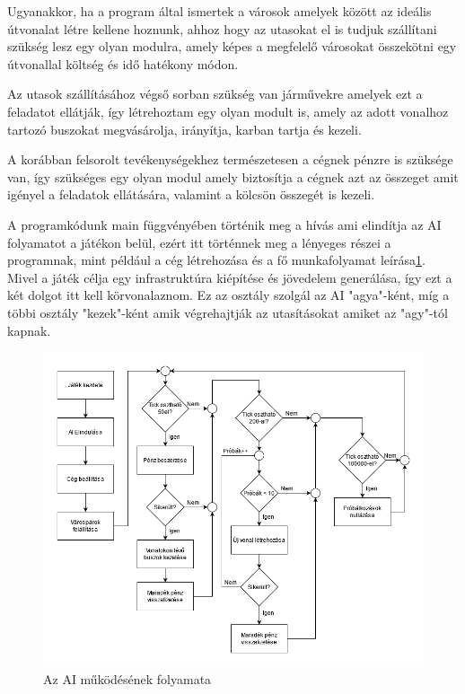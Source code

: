 Ugyanakkor, ha a program által ismertek a városok amelyek között az ideális útvonalat létre kellene hoznunk, ahhoz hogy az utasokat el is tudjuk szállítani szükség lesz egy olyan modulra, amely képes a megfelelő városokat összekötni egy útvonallal költség és idő hatékony módon.

Az utasok szállításához végső sorban szükség van járművekre amelyek ezt a feladatot ellátják, így létrehoztam egy olyan modult is, amely az adott vonalhoz tartozó buszokat megvásárolja, irányítja, karban tartja és kezeli.

A korábban felsorolt tevékenységekhez természetesen a cégnek pénzre is szüksége van, így szükséges egy olyan modul amely biztosítja a cégnek azt az összeget amit igényel a feladatok ellátására, valamint a kölcsön összegét is kezeli.



A programkódunk main függvényében történik meg a hívás ami elindítja az AI folyamatot a játékon belül, ezért itt történnek meg a lényeges részei a programnak, mint például a cég létrehozása és a fő munkafolyamat leírása\ref{fig:folyamat}. Mivel a játék célja egy infrastruktúra kiépítése és jövedelem generálása, így ezt a két dolgot itt kell körvonalaznom. Ez az osztály szolgál az AI "agya"-ként, míg a többi osztály "kezek"-ként amik végrehajtják az utasításokat amiket az "agy"-tól kapnak.

\begin{figure}
	\centering
	\includegraphics[scale=0.5]{images/folyamat.png}
	\caption{Az AI működésének folyamata}
	\label{fig:folyamat}
\end{figure}

